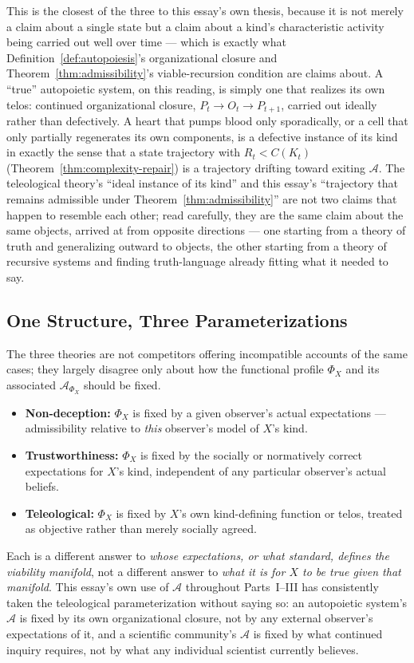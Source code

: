 \documentclass[11pt,a4paper]{article}
\theoremstyle{plain}
\theoremstyle{definition}
\theoremstyle{remark}
\newcommand{\Adm}{\mathcal{A}}
\begin{document}
This is the closest of the three to this essay's own thesis, because it is not merely a claim about a single state but a claim about a kind's characteristic activity being carried out well over time — which is exactly what Definition~\ref{def:autopoiesis}'s organizational closure and Theorem~\ref{thm:admissibility}'s viable-recursion condition are claims about. A ``true'' autopoietic system, on this reading, is simply one that realizes its own telos: continued organizational closure, $P_t \to O_t \to P_{t+1}$, carried out ideally rather than defectively. A heart that pumps blood only sporadically, or a cell that only partially regenerates its own components, is a defective instance of its kind in exactly the sense that a state trajectory with $R_t < C(K_t)$ (Theorem~\ref{thm:complexity-repair}) is a trajectory drifting toward exiting $\Adm$. The teleological theory's ``ideal instance of its kind'' and this essay's ``trajectory that remains admissible under Theorem~\ref{thm:admissibility}'' are not two claims that happen to resemble each other; read carefully, they are the same claim about the same objects, arrived at from opposite directions — one starting from a theory of truth and generalizing outward to objects, the other starting from a theory of recursive systems and finding truth-language already fitting what it needed to say.

\subsection{One Structure, Three Parameterizations}
\label{subsec:one-structure-three}

The three theories are not competitors offering incompatible accounts of the same cases; they largely disagree only about how the functional profile $\Phi_X$ and its associated $\Adm_{\Phi_X}$ should be fixed.
\begin{itemize}
  \item \textbf{Non-deception:} $\Phi_X$ is fixed by a given observer's actual expectations — admissibility relative to \emph{this} observer's model of $X$'s kind.
  \item \textbf{Trustworthiness:} $\Phi_X$ is fixed by the socially or normatively correct expectations for $X$'s kind, independent of any particular observer's actual beliefs.
  \item \textbf{Teleological:} $\Phi_X$ is fixed by $X$'s own kind-defining function or telos, treated as objective rather than merely socially agreed.
\end{itemize}
Each is a different answer to \emph{whose expectations, or what standard, defines the viability manifold}, not a different answer to \emph{what it is for $X$ to be true given that manifold}. This essay's own use of $\Adm$ throughout Parts~I--III has consistently taken the teleological parameterization without saying so: an autopoietic system's $\Adm$ is fixed by its own organizational closure, not by any external observer's expectations of it, and a scientific community's $\Adm$ is fixed by what continued inquiry requires, not by what any individual scientist currently believes.
\end{document}

